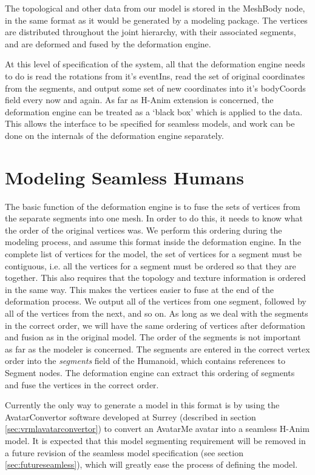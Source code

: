 \documentclass[10pt,oneside,fleqn,a4paper]{book}
\begin{document}
The topological and other data from our model is stored in the MeshBody node, in the same format as it would be generated by a modeling package. The vertices are distributed throughout the joint hierarchy, with their associated segments, and are deformed and fused by the deformation engine.

At this level of specification of the system, all that the deformation engine needs to do is read the rotations from it's eventIns, read the set of original coordinates from the segments, and output some set of new coordinates into it's bodyCoords field every now and again. As far as H-Anim extension is concerned, the deformation engine can be treated as a `black box' which is applied to the data. This allows the interface to be specified for seamless models, and work can be done on the internals of the deformation engine separately.

\section{\label{sec:vrmlmodeling}Modeling Seamless Humans}
The basic function of the deformation engine is to fuse the sets of vertices from the separate segments into one mesh. In order to do this, it needs to know what the order of the original vertices was. We perform this ordering during the modeling process, and assume this format inside the deformation engine. In the complete list of vertices for the model, the set of vertices for a segment must be contiguous, i.e. all the vertices for a segment must be ordered so that they are together. This also requires that the topology and texture information is ordered in the same way. This makes the vertices easier to fuse at the end of the deformation process. We output all of the vertices from one segment, followed by all of the vertices from the next, and so on. As long as we deal with the segments in the correct order, we will have the same ordering of vertices after deformation and fusion as in the original model. The order of the segments is not important as far as the modeler is concerned. The segments are entered in the correct vertex order into the {\it segments} field of the Humanoid, which contains references to Segment nodes. The deformation engine can extract this ordering of segments and fuse the vertices in the correct order.

Currently the only way to generate a model in this format is by using the AvatarConvertor software developed at Surrey (described in section \ref{sec:vrmlavatarconvertor}) to convert an AvatarMe avatar into a seamless H-Anim model. It is expected that this model segmenting requirement will be removed in a future revision of the seamless model specification (see section \ref{sec:futureseamless}), which will greatly ease the process of defining the model.
\end{document}
